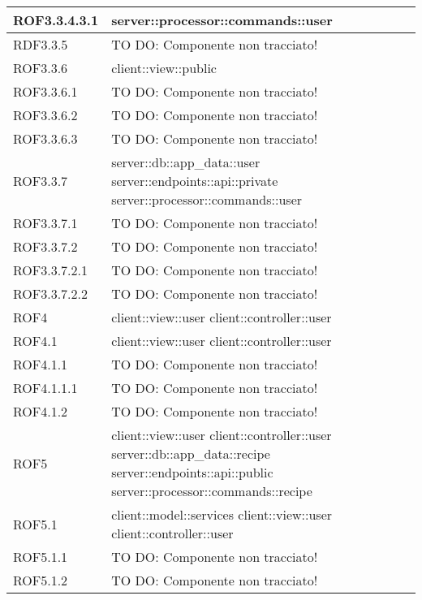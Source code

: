 \begin{center}
\begin{longtable}{| p{4cm} | p{8cm} |}
\hline
ROF3.3.4.3.1 & server::processor::commands::user \\
\hline
RDF3.3.5 & TO DO: Componente non tracciato! \\
\hline
ROF3.3.6 & client::view::public \\
\hline
ROF3.3.6.1 & TO DO: Componente non tracciato! \\
\hline
ROF3.3.6.2 & TO DO: Componente non tracciato! \\
\hline
ROF3.3.6.3 & TO DO: Componente non tracciato! \\
\hline
ROF3.3.7 & server::db::app\_data::user \newline server::endpoints::api::private \newline server::processor::commands::user \\
\hline
ROF3.3.7.1 & TO DO: Componente non tracciato! \\
\hline
ROF3.3.7.2 & TO DO: Componente non tracciato! \\
\hline
ROF3.3.7.2.1 & TO DO: Componente non tracciato! \\
\hline
ROF3.3.7.2.2 & TO DO: Componente non tracciato! \\
\hline
ROF4 & client::view::user \newline client::controller::user \\
\hline
ROF4.1 & client::view::user \newline client::controller::user \\
\hline
ROF4.1.1 & TO DO: Componente non tracciato! \\
\hline
ROF4.1.1.1 & TO DO: Componente non tracciato! \\
\hline
ROF4.1.2 & TO DO: Componente non tracciato! \\
\hline
ROF5 & client::view::user \newline client::controller::user \newline server::db::app\_data::recipe \newline server::endpoints::api::public \newline server::processor::commands::recipe \\
\hline
ROF5.1 & client::model::services \newline client::view::user \newline client::controller::user \\
\hline
ROF5.1.1 & TO DO: Componente non tracciato! \\
\hline
ROF5.1.2 & TO DO: Componente non tracciato! \\
\hline

\end{longtable}
\end{center}
